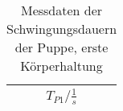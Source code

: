 \begin{table}[h]
  \centering
  \caption{Messdaten der Schwingungsdauern der Puppe, erste Körperhaltung}
  \label{tab:puppe1}
  \begin{tabular}{c}
    \toprule
     $T_{P1}/\si{\frac{1}{s}}$\\
    \midrule
      
    \bottomrule
  \end{tabular}
\end{table}
